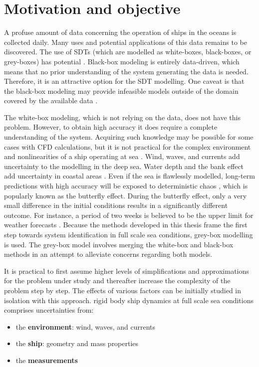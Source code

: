 \section{Motivation and objective}
\label{sec:motivation}
A profuse amount of data concerning the operation of ships in the oceans is collected daily. Many uses and potential applications of this data remains to be discovered. The use of SDTs (which are modelled as white-boxes, black-boxes, or grey-boxes) has potential .
Black-box modeling is entirely data-driven, which means that no prior understanding of the system generating the data is needed. Therefore, it is an attractive option for the SDT modelling. One caveat is that the black-box modeling may provide infeasible models outside of the domain covered by the available data \cite{nielsen_machine_2022}. 

The white-box modeling, which is not relying on the data, does not have this problem. However, to obtain high accuracy it does require a complete understanding of the system. Acquiring such knowledge may be possible for some cases with CFD calculations, but it is not practical for the complex environment and nonlinearities of a ship operating at sea \cite{miller_ship_2021}. 
Wind, waves, and currents add uncertainty to the modelling in the deep sea. Water depth and the bank effect add uncertainty in coastal areas \cite{nielsen_machine_2022}. 
Even if the sea is flawlessly modelled, long-term predictions with high accuracy will be exposed to deterministic chaos \cite{lorenz_deterministic_1963}, which is popularly known as the butterfly effect. During the butterfly effect, only a very small difference in the initial conditions results in a significantly different outcome. For instance, a period of two weeks is believed to be the upper limit for weather forecasts  \cite{zhang_what_2019}. Because the methods developed in this thesis frame the first step towards system identification in full scale sea conditions, grey-box modelling is used. The grey-box model involves merging the white-box and black-box methods in an attempt to alleviate concerns regarding both models. 

It is practical to first assume higher levels of simplifications and approximations for the problem under study and thereafter increase the complexity of the problem step by step. The effects of various factors can be initially studied in isolation with this approach. 
rigid body ship dynamics at full scale sea conditions comprises uncertainties from:
\begin{itemize}
    \item the \textbf{environment}: wind, waves, and currents
    \item the \textbf{ship}: geometry and mass properties
    \item the \textbf{measurements}
\end{itemize}

